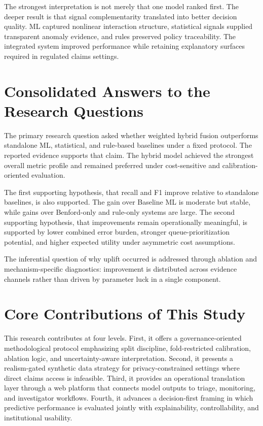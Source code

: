 \documentclass[12pt,a4paper]{report}
\begin{document}
The strongest interpretation is not merely that one model ranked first. The deeper result is that signal complementarity translated into better decision quality. ML captured nonlinear interaction structure, statistical signals supplied transparent anomaly evidence, and rules preserved policy traceability. The integrated system improved performance while retaining explanatory surfaces required in regulated claims settings.

\section{Consolidated Answers to the Research Questions}
The primary research question asked whether weighted hybrid fusion outperforms standalone ML, statistical, and rule-based baselines under a fixed protocol. The reported evidence supports that claim. The hybrid model achieved the strongest overall metric profile and remained preferred under cost-sensitive and calibration-oriented evaluation.

The first supporting hypothesis, that recall and F1 improve relative to standalone baselines, is also supported. The gain over Baseline ML is moderate but stable, while gains over Benford-only and rule-only systems are large. The second supporting hypothesis, that improvements remain operationally meaningful, is supported by lower combined error burden, stronger queue-prioritization potential, and higher expected utility under asymmetric cost assumptions.

The inferential question of why uplift occurred is addressed through ablation and mechanism-specific diagnostics: improvement is distributed across evidence channels rather than driven by parameter luck in a single component.

\section{Core Contributions of This Study}
This research contributes at four levels. First, it offers a governance-oriented methodological protocol emphasizing split discipline, fold-restricted calibration, ablation logic, and uncertainty-aware interpretation. Second, it presents a realism-gated synthetic data strategy for privacy-constrained settings where direct claims access is infeasible. Third, it provides an operational translation layer through a web platform that connects model outputs to triage, monitoring, and investigator workflows. Fourth, it advances a decision-first framing in which predictive performance is evaluated jointly with explainability, controllability, and institutional usability.
\end{document}
